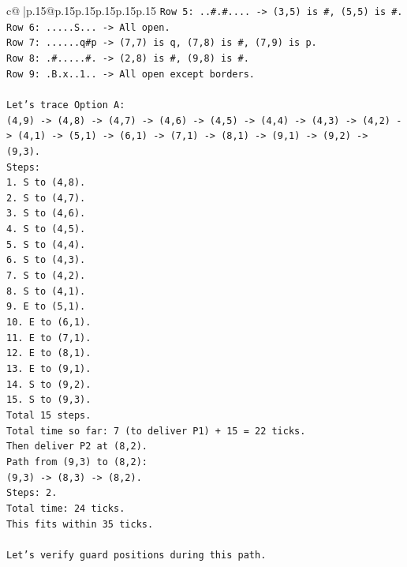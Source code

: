 \documentclass{article}
\begin{document}
{\begin{supertabular}{c@{$\;$}|p{.15\linewidth}@{}p{.15\linewidth}p{.15\linewidth}p{.15\linewidth}p{.15\linewidth}p{.15\linewidth}}
{{{\texttt{Row 5: ..\#.\#.... {-}> (3,5) is \#, (5,5) is \#.} \\
\texttt{Row 6: .....S... {-}> All open.} \\
\texttt{Row 7: ......q\#p {-}> (7,7) is q, (7,8) is \#, (7,9) is p.} \\
\texttt{Row 8: .\#.....\#. {-}> (2,8) is \#, (9,8) is \#.} \\
\texttt{Row 9: .B.x..1.. {-}> All open except borders.} \\
\\ 
\texttt{Let's trace Option A:} \\
\texttt{(4,9) {-}> (4,8) {-}> (4,7) {-}> (4,6) {-}> (4,5) {-}> (4,4) {-}> (4,3) {-}> (4,2) {-}> (4,1) {-}> (5,1) {-}> (6,1) {-}> (7,1) {-}> (8,1) {-}> (9,1) {-}> (9,2) {-}> (9,3).} \\
\texttt{Steps:} \\
\texttt{1. S to (4,8).} \\
\texttt{2. S to (4,7).} \\
\texttt{3. S to (4,6).} \\
\texttt{4. S to (4,5).} \\
\texttt{5. S to (4,4).} \\
\texttt{6. S to (4,3).} \\
\texttt{7. S to (4,2).} \\
\texttt{8. S to (4,1).} \\
\texttt{9. E to (5,1).} \\
\texttt{10. E to (6,1).} \\
\texttt{11. E to (7,1).} \\
\texttt{12. E to (8,1).} \\
\texttt{13. E to (9,1).} \\
\texttt{14. S to (9,2).} \\
\texttt{15. S to (9,3).} \\
\texttt{Total 15 steps.} \\
\texttt{Total time so far: 7 (to deliver P1) + 15 = 22 ticks.} \\
\texttt{Then deliver P2 at (8,2).} \\
\texttt{Path from (9,3) to (8,2):} \\
\texttt{(9,3) {-}> (8,3) {-}> (8,2).} \\
\texttt{Steps: 2.} \\
\texttt{Total time: 24 ticks.} \\
\texttt{This fits within 35 ticks.} \\
\\ 
\texttt{Let's verify guard positions during this path.} \\
}}}
\end{supertabular}}
\end{document}
